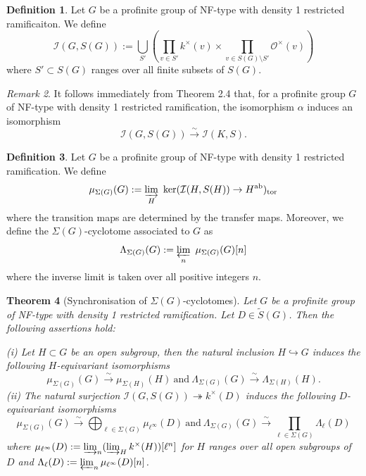 \documentclass{article}
\newtheorem{thm}{Theorem}[section]
\theoremstyle{plain}
\theoremstyle{definition}
\newtheorem{defn}[thm]{Definition}
\theoremstyle{remark}
\newtheorem{rem}[thm]{Remark}
\begin{document}
\begin{defn}
Let $G$ be a profinite group of NF-type with density 1 restricted ramificaiton. We define
$$
\mathcal{I}(G,S(G)) := \bigcup_{S'} (\prod_{v \in S'} k^{\times}(v) \times \prod_{v \in S(G) \setminus S'} \mathcal{O}^{\times}(v))
$$
where $S' \subset S(G)$ ranges over all finite subsets of $S(G)$.
\end{defn}
\begin{rem}
It follows immediately from Theorem 2.4 that, for a profinite group $G$ of NF-type with density 1 restricted ramification, the isomorphism $\alpha$ induces an isomorphism
$$
\mathcal{I}(G,S(G)) \xrightarrow{\sim} \mathcal{I}(K,S).
$$
\end{rem}
\begin{defn}
Let $G$ be a profinite group of NF-type with density 1 restricted ramification. We define
$$
\mu_{\Sigma(G)}(G) := \varinjlim_H ~\text{ker}(\mathcal{I}(H,S(H)) \to H^{\text{ab}})_{\text{tor}}
$$
where the transition maps are determined by the transfer maps. Moreover, we define the $\Sigma(G)$-cyclotome associated to $G$ as
$$
\Lambda_{\Sigma(G)}(G) := \varprojlim_n ~\mu_{\Sigma(G)}(G)[n]
$$
where the inverse limit is taken over all positive integers $n$.
\end{defn}
\begin{thm}[Synchronisation of $\Sigma(G)$-cyclotomes]
Let $G$ be a profinite group of NF-type with density 1 restricted ramification. Let $D \in \widetilde{S}(G)$. Then the following assertions hold: \par 
(i) Let $H \subset G$ be an open subgroup, then the natural inclusion $H \hookrightarrow G$ induces the following $H$-equivariant isomorphisms
$$
\mu_{\Sigma(G)}(G) \xrightarrow{\sim} \mu_{\Sigma(H)}(H)~\text{and}~\Lambda_{\Sigma(G)}(G) \xrightarrow{\sim} \Lambda_{\Sigma(H)}(H).
$$
(ii) The natural surjection $\mathcal{I}(G,S(G)) \twoheadrightarrow k^{\times}(D)$ induces the following $D$-equivariant isomorphisms
$$
\mu_{\Sigma(G)}(G) \xrightarrow{\sim} \bigoplus_{\ell \in \Sigma(G)}\mu_{\ell^{\infty}}(D)~\text{and}~ \Lambda_{\Sigma(G)}(G) \xrightarrow{\sim} \prod_{\ell \in \Sigma(G)} \Lambda_\ell(D)
$$
where $\mu_{\ell^{\infty}}(D) := \varinjlim_n (\varinjlim_H k^{\times}(H))[\ell^n]$ for $H$ ranges over all open subgroups of $D$ and $\Lambda_\ell(D) := \varprojlim_n \mu_{\ell^{\infty}}(D)[n]$.
\end{thm}
\end{document}

